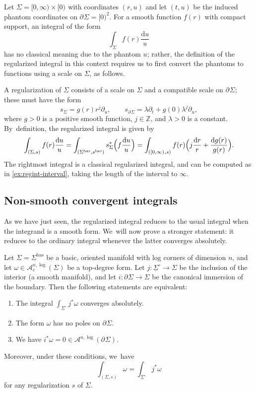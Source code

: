 \documentclass[10pt]{amsart}
\let\oldbullet\bullet
\renewcommand{\bullet}{{\raisebox{1pt}{$\scriptscriptstyle\oldbullet$}}}
\newcommand{\rBrac}[1]{\Bigl(#1\Bigr)}
\theoremstyle{definition}
\theoremstyle{remark}
\newenvironment{example}
  {\pushQED{\qed}\renewcommand{\qedsymbol}{$\lozenge$}\examplex}
  {\popQED\endexamplex}
\newcommand{\ZZ}{\mathbb{Z}}
\newcommand{\model}[2]{\halfspc{#1}\times[0)^{#2}}
\newcommand{\halfspc}[1]{[0,\infty)^{#1}}
\newcommand{\dd}{\mathrm{d}}
\newcommand{\dlog}[1]{\frac{\dd#1}{#1}}
\newcommand{\Alog}[2][\bullet]{\mathscr{A}^{#1,\log}(#2)}
\newcommand{\Alogc}[2][\bullet]{\mathscr{A}^{#1,\log}_c(#2)}
\newcommand{\cvf}[1]{\partial_{#1}}
\newcommand{\Sig}{\Sigma}
\newcommand{\uSigo}{\underline{\Sigma}^\circ}
\newcommand{\bas}[1]{{#1}^{\mathrm{bas}}}
\newcommand{\Sigbas}{\bas{\Sig}}
\newcommand{\bdSig}[1][]{\partial^{#1}\Sigma}
\begin{document}
\begin{example}
Let $\Sig = \model{}{}$ with coordinates $(r,u)$ and let $(t,u)$ be the induced phantom coordinates on $\bdSig = [0)^2$. For a smooth function $f(r)$ with compact support, an integral of the form
\[
\int_{\Sig} f(r)\dlog{u}
\]
has no classical meaning due to the phantom $u$; rather, the definition of the regularized integral in this context requires us to first convert the phantoms to functions using a scale on $\Sig$, as follows.

A regularization of $\Sig$ consists of a scale on $\Sig$ and a compatible scale on $\bdSig$; these must have the form
\[
s_\Sig = g(r) r^j \cvf{u}, \qquad s_{\bdSig} = \lambda \cvf{t} + g(0)\lambda^j \cvf{u},
\]
where $g > 0$ is a positive smooth function, $j \in \ZZ$, and $\lambda > 0$ is a constant. By~definition, the regularized integral is given by
\[
\int_{(\Sig,s)}f(r)\dlog{u} = \int_{(\Sigbas,\bas{s})} s_\Sig^*\rBrac{f\dlog{u}} = \int_{(\halfspc{},s)} f(r) \rBrac{j \dlog{r} + \dlog{g(r)}}.
\]
The rightmost integral is a classical regularized integral, and can be computed as in \autoref{ex:regint-interval}, taking the length of the interval to $\infty$.
\end{example}

\subsection{Non-smooth convergent integrals}

As we have just seen, the regularized integral reduces to the usual integral when the integrand is a smooth form. We~will now prove a stronger statement: it reduces to the ordinary integral whenever the latter converges absolutely.

\begin{proposition}\label{prop:convergent-integrals}
Let $\Sig = \Sigbas$ be a basic, oriented manifold with log corners of dimension $n$, and let $\omega \in \Alogc[n]{\Sig}$ be a top-degree form. Let $j \colon \uSigo \to \Sig$ be the inclusion of the interior (a smooth manifold), and let $i \colon \bdSig \to \Sig$ be the canonical immersion of the boundary.
Then the following statements are equivalent:
\begin{enumerate}
\item\label{prop:convergent-integrals1}
The integral $\int_{\uSigo} j^*\omega$ converges absolutely.
\item\label{prop:convergent-integrals2}
The form $\omega$ has no poles on $\bdSig$.
\item\label{prop:convergent-integrals3}
We have $i^*\omega = 0 \in \Alog[n]{\bdSig}$.
\end{enumerate}
Moreover, under these conditions, we~have
\[
\int_{(\Sig,s)}\omega = \int_{\uSigo} j^*\omega
\]
for any regularization $s$ of $\Sig$.
\end{proposition}
\end{document}
